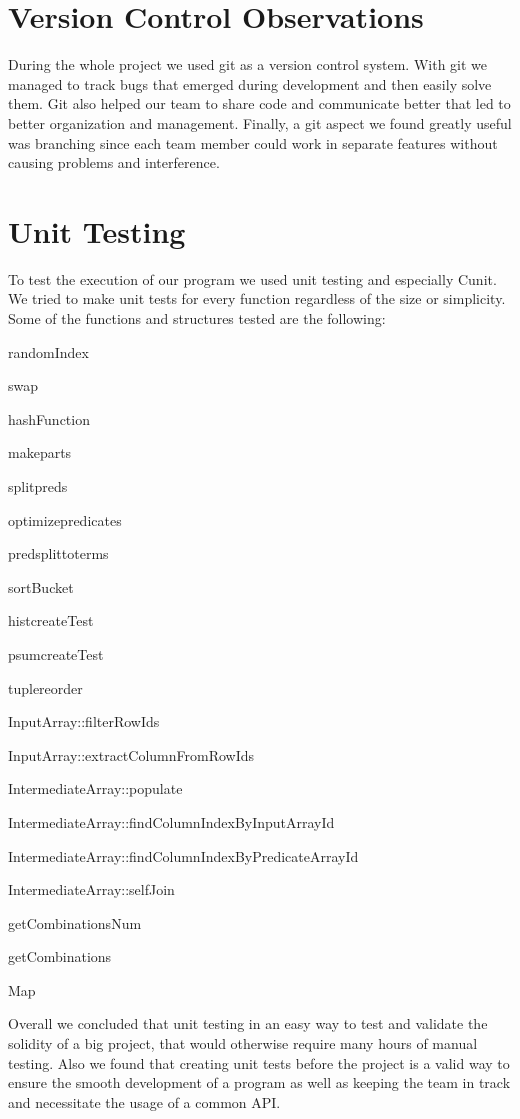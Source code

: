 \documentclass{ws-ijprai}
\begin{document}
\section{Version Control Observations}
\tab During the whole project we used git as a version control system. With git we managed to track bugs that emerged during development and then easily solve them. Git also helped our team to share code and communicate better that led to better organization and management. Finally, a git aspect we found greatly useful was branching since each team member could work in separate features without causing problems and interference.

\clearpage
\section{Unit Testing}

\tab To test the execution of our program we used unit testing and especially Cunit. We tried to make unit tests for every function regardless of the size or simplicity. Some of the functions and structures tested are the following: 
\begin{itemlist}
\item randomIndex
\item swap
\item hashFunction
\item makeparts
\item splitpreds
\item optimizepredicates
\item predsplittoterms
\item sortBucket
\item histcreateTest
\item psumcreateTest
\item tuplereorder
\item InputArray::filterRowIds
\item InputArray::extractColumnFromRowIds
\item IntermediateArray::populate
\item IntermediateArray::findColumnIndexByInputArrayId
\item IntermediateArray::findColumnIndexByPredicateArrayId
\item IntermediateArray::selfJoin
\item getCombinationsNum
\item getCombinations
\item Map
\end{itemlist}
\tab Overall we concluded that unit testing in an easy way to test and validate the solidity of a big project, that would otherwise require many hours of manual testing. Also we found that creating unit tests before the project is a valid way to ensure the smooth development of a program as well as keeping the team in track and necessitate the usage of a common API.
\clearpage
\end{document}
